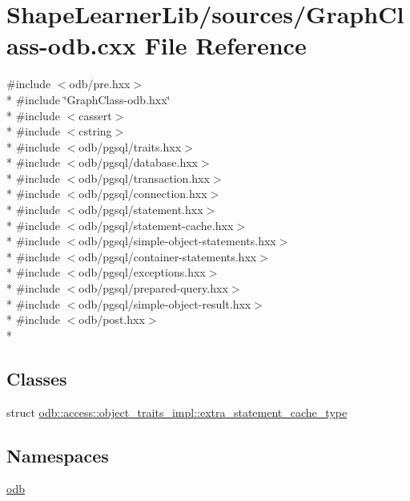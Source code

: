 \hypertarget{_graph_class-odb_8cxx}{}\section{Shape\+Learner\+Lib/sources/\+Graph\+Class-\/odb.cxx File Reference}
\label{_graph_class-odb_8cxx}
{\ttfamily \#include $<$odb/pre.\+hxx$>$}\\*
{\ttfamily \#include \char`\"{}Graph\+Class-\/odb.\+hxx\char`\"{}}\\*
{\ttfamily \#include $<$cassert$>$}\\*
{\ttfamily \#include $<$cstring$>$}\\*
{\ttfamily \#include $<$odb/pgsql/traits.\+hxx$>$}\\*
{\ttfamily \#include $<$odb/pgsql/database.\+hxx$>$}\\*
{\ttfamily \#include $<$odb/pgsql/transaction.\+hxx$>$}\\*
{\ttfamily \#include $<$odb/pgsql/connection.\+hxx$>$}\\*
{\ttfamily \#include $<$odb/pgsql/statement.\+hxx$>$}\\*
{\ttfamily \#include $<$odb/pgsql/statement-\/cache.\+hxx$>$}\\*
{\ttfamily \#include $<$odb/pgsql/simple-\/object-\/statements.\+hxx$>$}\\*
{\ttfamily \#include $<$odb/pgsql/container-\/statements.\+hxx$>$}\\*
{\ttfamily \#include $<$odb/pgsql/exceptions.\+hxx$>$}\\*
{\ttfamily \#include $<$odb/pgsql/prepared-\/query.\+hxx$>$}\\*
{\ttfamily \#include $<$odb/pgsql/simple-\/object-\/result.\+hxx$>$}\\*
{\ttfamily \#include $<$odb/post.\+hxx$>$}\\*
\subsection*{Classes}
\begin{DoxyCompactItemize}
\item 
struct \hyperlink{structodb_1_1access_1_1object__traits__impl_1_1extra__statement__cache__type}{odb\+::access\+::object\+\_\+traits\+\_\+impl\+::extra\+\_\+statement\+\_\+cache\+\_\+type}
\end{DoxyCompactItemize}
\subsection*{Namespaces}
\begin{DoxyCompactItemize}
\item 
 \hyperlink{namespaceodb}{odb}
\end{DoxyCompactItemize}
